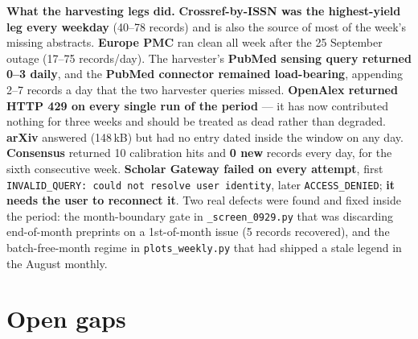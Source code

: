 \documentclass[10pt]{article}
\begin{document}
\vspace{1.5mm}
\textbf{What the harvesting legs did.} \textbf{Crossref-by-ISSN was the highest-yield leg every
weekday} (40--78 records) and is also the source of most of the week's missing abstracts. \textbf{Europe
PMC} ran clean all week after the 25 September outage (17--75 records/day). The harvester's
\textbf{PubMed sensing query returned 0--3 daily}, and the \textbf{PubMed connector remained
load-bearing}, appending 2--7 records a day that the two harvester queries missed. \textbf{OpenAlex
returned HTTP 429 on every single run of the period} --- it has now contributed nothing for three
weeks and should be treated as dead rather than degraded. \textbf{arXiv} answered (148\,kB) but had no
entry dated inside the window on any day. \textbf{Consensus} returned 10 calibration hits and
\textbf{0 new} records every day, for the sixth consecutive week. \textbf{Scholar Gateway failed on
every attempt}, first \texttt{INVALID\_QUERY: could not resolve user identity}, later
\texttt{ACCESS\_DENIED}; \textbf{it needs the user to reconnect it}. Two real defects were found and
fixed inside the period: the month-boundary gate in \texttt{\_screen\_0929.py} that was discarding
end-of-month preprints on a 1st-of-month issue (5 records recovered), and the batch-free-month regime
in \texttt{plots\_weekly.py} that had shipped a stale legend in the August monthly.

\vspace{2mm}
\section*{\sffamily\bfseries\color{Deep}Open gaps}
\vspace{-1.5mm}{\color{Teal}\rule{\linewidth}{1.1pt}}\vspace{2.5mm}
\end{document}
